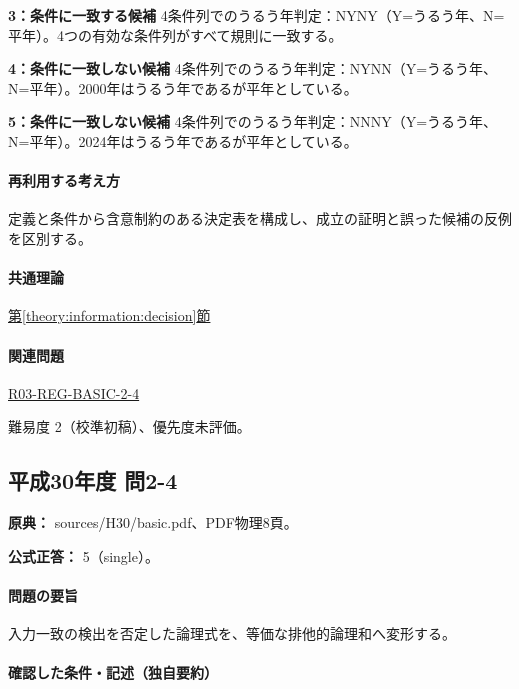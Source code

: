 \noindent\textbf{3：条件に一致する候補} 4条件列でのうるう年判定：NYNY（Y=うるう年、N=平年）。4つの有効な条件列がすべて規則に一致する。\par

\noindent\textbf{4：条件に一致しない候補} 4条件列でのうるう年判定：NYNN（Y=うるう年、N=平年）。2000年はうるう年であるが平年としている。\par

\noindent\textbf{5：条件に一致しない候補} 4条件列でのうるう年判定：NNNY（Y=うるう年、N=平年）。2024年はうるう年であるが平年としている。\par

\paragraph{再利用する考え方} 定義と条件から含意制約のある決定表を構成し、成立の証明と誤った候補の反例を区別する。

\paragraph{共通理論} \hyperref[theory:information:decision]{第\ref*{theory:information:decision}節}

\paragraph{関連問題} \hyperref[q:r03-reg-basic-2-4]{R03-REG-BASIC-2-4}

\par 難易度 2（校準初稿）、優先度未評価。

\subsection{平成30年度 問2-4}
\label{q:h30-reg-basic-2-4}

\noindent\textbf{原典：} sources/H30/basic.pdf、PDF物理8頁。

\textbf{公式正答：} 5（single）。

\paragraph{問題の要旨} 入力一致の検出を否定した論理式を、等価な排他的論理和へ変形する。

\paragraph{確認した条件・記述（独自要約）}\mbox{}\par

